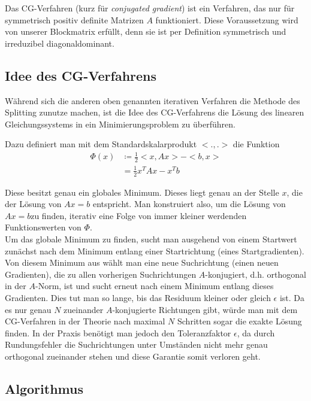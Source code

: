 \documentclass{scrartcl}
\begin{document}
Das CG-Verfahren (kurz für \textit{conjugated gradient}) ist ein Verfahren, das nur für symmetrisch positiv definite Matrizen $A$ funktioniert.
Diese Voraussetzung wird von unserer Blockmatrix erfüllt, denn sie ist per Definition symmetrisch und irreduzibel diagonaldominant.

\subsection{Idee des CG-Verfahrens}

Während sich die anderen oben genannten iterativen Verfahren die Methode des Splitting zunutze machen, ist die Idee des CG-Verfahrens die Lösung des linearen Gleichungssystems in ein Minimierungsproblem zu überführen.

Dazu definiert man mit dem Standardskalarprodukt $<.,.>$ die Funktion
\begin{align*}
  \Phi (x) &\coloneqq \frac{1}{2}<x,Ax> - <b,x>\\
           &=\frac{1}{2}x^T Ax - x^T b
\end{align*}

Diese besitzt genau ein globales Minimum. Dieses liegt genau an der Stelle $x$, die der Lösung von $Ax=b$ entspricht. Man konstruiert also, um die Lösung von $Ax=b$zu finden, iterativ eine Folge von immer kleiner werdenden Funktionswerten von $\Phi$.\\

Um das globale Minimum zu finden, sucht man ausgehend von einem Startwert zunächst nach dem Minimum entlang einer Startrichtung (eines Startgradienten).
Von diesem Minimum aus wählt man eine neue Suchrichtung (einen neuen Gradienten), die zu allen vorherigen Suchrichtungen $A$-konjugiert, d.h. orthogonal in der $A$-Norm, ist und sucht erneut nach einem Minimum entlang dieses Gradienten.
Dies tut man so lange, bis das Residuum kleiner oder gleich $\epsilon$ ist.
Da es nur genau $N$ zueinander $A$-konjugierte Richtungen gibt, würde man mit dem CG-Verfahren in der Theorie nach maximal $N$ Schritten sogar die exakte Lösung finden.
In der Praxis benötigt man jedoch den Toleranzfaktor $\epsilon$, da durch Rundungsfehler die Suchrichtungen unter Umständen nicht mehr genau orthogonal zueinander stehen und diese Garantie somit verloren geht.\\

\subsection{Algorithmus}
\end{document}
